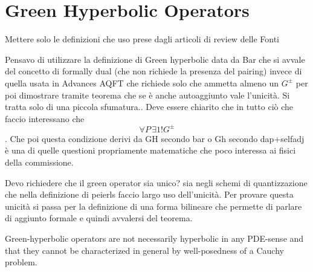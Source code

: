 \documentclass[Main]{subfiles}
\begin{document}
		\section{Green Hyperbolic Operators}
			\begin{Warning}
				Mettere solo le definizioni che uso prese dagli articoli di review delle Fonti
		\end{Warning}	
					\begin{Warning}
				Pensavo di utilizzare la definizione di Green hyperbolic data da Bar che si avvale del concetto di formally dual (che non richiede la presenza del pairing) invece di quella usata in Advances AQFT che richiede solo che ammetta almeno un $G^\pm$  per poi dimostrare tramite teorema che se è anche autoaggiunto vale l'unicità. Si tratta solo di una piccola sfumatura.. Deve essere chiarito che in tutto ciò che faccio interessano che $$\forall P \, \exists1!G^\pm$$.
				Che poi questa condizione derivi da GH secondo bar o Gh secondo dap+selfadj è una di quelle questioni propriamente matematiche che poco interessa ai fisici della commissione.
			\end{Warning}			
			
			\begin{Warning}
			Devo richiedere che il green operator sia unico? sia negli schemi di quantizzazione che nella definizione di peierls faccio largo uso dell'unicità. 
			Per provare questa unicità si passa per la definizione di una forma bilineare che permette di parlare di aggiunto formale e quindi avvalersi del teorema.
			\end{Warning}
			
		    Green-hyperbolic operators are not necessarily hyperbolic in any PDE-sense and that they cannot be characterized in general by well-posedness of a Cauchy problem. \cite{Terlaky2010} \cite{Bar2010}
		
		
		
				
				
\end{document}
